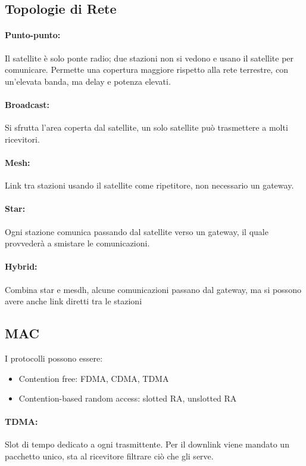 \subsection{Topologie di Rete}

\paragraph{Punto-punto:} Il satellite è solo ponte radio; due stazioni non si vedono e usano il satellite per comunicare. Permette una copertura maggiore rispetto alla rete terrestre, con un'elevata banda, ma delay e potenza elevati.

\paragraph{Broadcast:} Si sfrutta l'area coperta dal satellite, un solo satellite può trasmettere a molti ricevitori.

\paragraph{Mesh:} Link tra stazioni usando il satellite come ripetitore, non necessario un gateway.

\paragraph{Star:} Ogni stazione comunica passando dal satellite verso un gateway, il quale provvederà a smistare le comunicazioni.

\paragraph{Hybrid:} Combina star e mesdh, alcune comunicazioni passano dal gateway, ma si possono avere anche link diretti tra le stazioni 

\subsection{MAC}

I protocolli possono essere: 
\begin{itemize}
    \item Contention free: FDMA, CDMA, TDMA
    
    \item Contention-based random access: slotted RA, unslotted RA
\end{itemize}

\paragraph{TDMA:} Slot di tempo dedicato a ogni trasmittente. Per il downlink viene mandato un pacchetto unico, sta al ricevitore filtrare ciò che gli serve.

